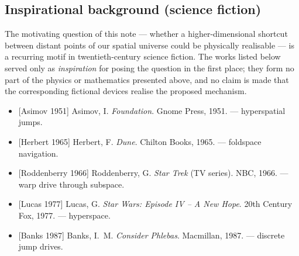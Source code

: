 \documentclass[11pt,a4paper]{article}
\begin{document}
\subsection*{Inspirational background (science fiction)}

The motivating question of this note --- whether a higher-dimensional shortcut between distant points of our spatial universe could be physically realisable --- is a recurring motif in twentieth-century science fiction. The works listed below served only as \emph{inspiration} for posing the question in the first place; they form no part of the physics or mathematics presented above, and no claim is made that the corresponding fictional devices realise the proposed mechanism.

\begin{itemize}[leftmargin=*]
\item {[Asimov 1951]} Asimov, I. \emph{Foundation}. Gnome Press, 1951. --- hyperspatial jumps.
\item {[Herbert 1965]} Herbert, F. \emph{Dune}. Chilton Books, 1965. --- foldspace navigation.
\item {[Roddenberry 1966]} Roddenberry, G. \emph{Star Trek} (TV series). NBC, 1966. --- warp drive through subspace.
\item {[Lucas 1977]} Lucas, G. \emph{Star Wars: Episode IV -- A New Hope}. 20th Century Fox, 1977. --- hyperspace.
\item {[Banks 1987]} Banks, I.~M. \emph{Consider Phlebas}. Macmillan, 1987. --- discrete jump drives.
\end{itemize}
\end{document}
